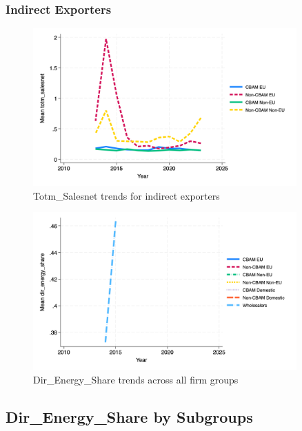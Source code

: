\documentclass{article}
\begin{document}
\subsubsection{Indirect Exporters}
\begin{figure}[h!]
\centering
\includegraphics[width=0.9\textwidth]{totm_salesnet_indir.png}
\caption{Totm_Salesnet trends for indirect exporters}
\label{fig:totm_salesnet_indir}
\end{figure}

\begin{figure}[h!]
\centering
\includegraphics[width=0.9\textwidth]{dir_energy_share_main_groups.png}
\caption{Dir_Energy_Share trends across all firm groups}
\label{fig:dir_energy_share_main}
\end{figure}

\subsection{Dir_Energy_Share by Subgroups}
\end{document}
